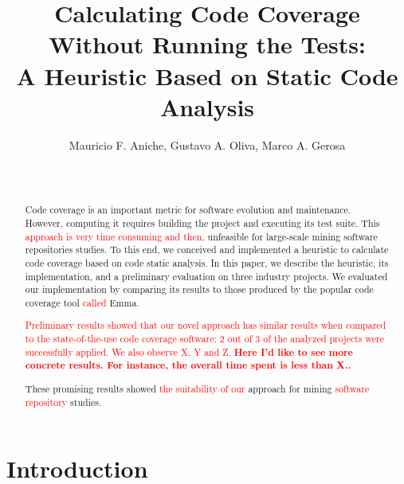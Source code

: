 \documentclass{sig-alternate}
\begin{document}

\title{Calculating Code Coverage Without Running the Tests:\\
A Heuristic Based on Static Code Analysis}

\author{
\alignauthor
Mauricio F. Aniche, Gustavo A. Oliva, Marco A. Gerosa\\
\\
\\
}

\maketitle
\begin{abstract}

Code coverage is an important metric for software evolution and maintenance.
However, computing it requires building the project and executing its test suite.
This \textcolor{red}{approach is very time consuming and then,} unfeasible for large-scale mining software repositories studies. To this end,
we conceived and implemented a heuristic to calculate code coverage based on 
code static analysis. In this paper, we describe the heuristic, its implementation, 
and a preliminary evaluation on three industry projects. We evaluated our implementation by 
comparing its results to those produced by the popular code coverage tool \textcolor{red}{called} Emma. 

\textcolor{red}{Preliminary results showed that our novel approach has similar results when compared to the state-of-the-use code coverage software: 2 out of 3 of the analyzed projects were successfully applied. We also observe X, Y and Z. \textbf{Here I'd like to see more concrete results. For instance, the overall time spent is less than X..}}

These promising results showed  \textcolor{red}{the suitability of our} approach for mining \textcolor{red}{software repository} studies.


\end{abstract}

\section{Introduction}
\label{sec:intro}
\end{document}
